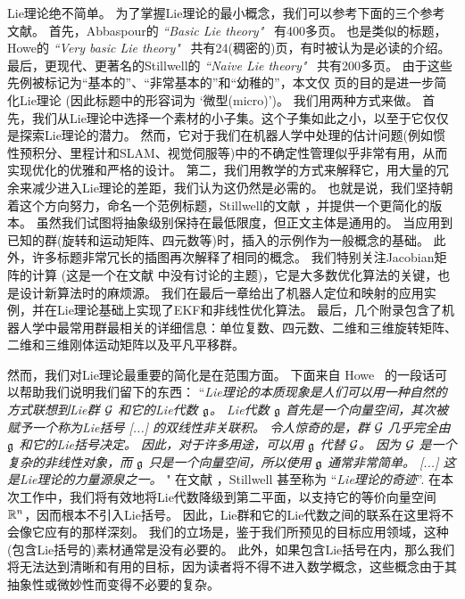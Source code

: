 Lie理论绝不简单。 
为了掌握Lie理论的最小概念，我们可以参考下面的三个参考文献。 
首先，Abbaspour的 \emph{``Basic Lie theory"}~\cite{ABBASPOUR-2007-Basic_Lie_theory} 有400多页。
也是类似的标题，Howe的 \emph{``Very basic Lie theory"}~\cite{Howe-Basic_Lie} 共有24(稠密的)页，有时被认为是必读的介绍。
最后，更现代、更著名的Stillwell的 \emph{``Naive Lie theory"}~\cite{STILLWELL-08} 共有200多页。
%
由于这些先例被标记为“基本的”、“非常基本的”和“幼稚的”，本文仅 \pageref{LastPage} 页的目的是进一步简化Lie理论 (因此标题中的形容词为 `微型(micro)')。
我们用两种方式来做。
首先，我们从Lie理论中选择一个素材的小子集。这个子集如此之小，以至于它仅仅是探索Lie理论的潜力。 
然而，它对于我们在机器人学中处理的估计问题(例如惯性预积分、里程计和SLAM、视觉伺服等)中的不确定性管理似乎非常有用，从而实现优化的优雅和严格的设计。
第二，我们用教学的方式来解释它，用大量的冗余来减少进入Lie理论的差距，我们认为这仍然是必需的。
也就是说，我们坚持朝着这个方向努力，命名一个范例标题，Stillwell的文献 \cite{STILLWELL-08}，并提供一个更简化的版本。
虽然我们试图将抽象级别保持在最低限度，但正文主体是通用的。
当应用到已知的群(旋转和运动矩阵、四元数等)时，插入的示例作为一般概念的基础。 
此外，许多标题非常冗长的插图再次解释了相同的概念。
我们特别关注Jacobian矩阵的计算 (这是一个在文献 \cite{STILLWELL-08} 中没有讨论的主题)，它是大多数优化算法的关键，也是设计新算法时的麻烦源。
我们在最后一章给出了机器人定位和映射的应用实例，并在Lie理论基础上实现了EKF和非线性优化算法。
最后，几个附录包含了机器人学中最常用群最相关的详细信息：单位复数、四元数、二维和三维旋转矩阵、二维和三维刚体运动矩阵以及平凡平移群。


然而，我们对Lie理论最重要的简化是在范围方面。 
下面来自 
Howe~\cite{Howe-Basic_Lie} 的一段话可以帮助我们说明我们留下的东西：
%
``\emph{Lie理论的本质现象是人们可以用一种自然的方式联想到Lie群 $\mathcal{G}$ 和它的Lie代数 $\frak{g}$。
Lie代数 $\frak{g}$ 首先是一个向量空间，其次被赋予一个称为Lie括号 [...] 的双线性非关联积。 
令人惊奇的是，群 $\mathcal{G}$ 几乎完全由 $\frak{g}$ 和它的Lie括号决定。
因此，对于许多用途，可以用 $\frak{g}$ 代替 $\mathcal{G}$。
因为 $\mathcal{G}$ 是一个复杂的非线性对象，而 $\frak{g}$ 只是一个向量空间，所以使用 $\frak{g}$ 通常非常简单。
[...] 
这是Lie理论的力量源泉之一。%
}"
%
在文献 \cite{STILLWELL-08}，Stillwell 甚至称为 ``\emph{Lie理论的奇迹}''.
在本次工作中，我们将有效地将Lie代数降级到第二平面，以支持它的等价向量空间 ${\mathbb R}^n$，因而根本不引入Lie括号。
因此，Lie群和它的Lie代数之间的联系在这里将不会像它应有的那样深刻。
我们的立场是，鉴于我们所预见的目标应用领域，这种(包含Lie括号的)素材通常是没有必要的。
此外，如果包含Lie括号在内，那么我们将无法达到清晰和有用的目标，因为读者将不得不进入数学概念，这些概念由于其抽象性或微妙性而变得不必要的复杂。



